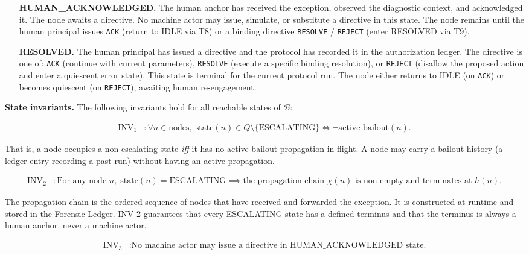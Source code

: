 \begin{itemize}
\item[\textbf{HUMAN\_ACKNOWLEDGED.}] The human anchor has received the exception, observed the diagnostic context, and acknowledged it. The node awaits a directive. No machine actor may issue, simulate, or substitute a directive in this state. The node remains until the human principal issues \texttt{ACK} (return to IDLE via T8) or a binding directive \texttt{RESOLVE} / \texttt{REJECT} (enter RESOLVED via T9).

\item[\textbf{RESOLVED.}] The human principal has issued a directive and the protocol has recorded it in the authorization ledger. The directive is one of: \texttt{ACK} (continue with current parameters), \texttt{RESOLVE} (execute a specific binding resolution), or \texttt{REJECT} (disallow the proposed action and enter a quiescent error state). This state is terminal for the current protocol run. The node either returns to IDLE (on \texttt{ACK}) or becomes quiescent (on \texttt{REJECT}), awaiting human re-engagement.
\end{itemize}

\bigskip
\noindent\textbf{State invariants.} The following invariants hold for all reachable states of $\mathcal{B}$:

\begin{align}
\text{INV}_1 &: \forall n \in \text{nodes},\; \text{state}(n) \in Q \setminus \{\text{ESCALATING}\} \iff \neg\text{active\_bailout}(n). \tag{INV-1}
\end{align}

That is, a node occupies a non-escalating state \emph{iff} it has no active bailout propagation in flight. A node may carry a bailout history (a ledger entry recording a past run) without having an active propagation.

\begin{align}
\text{INV}_2 &: \text{For any node } n,\; \text{state}(n) = \text{ESCALATING} \implies \text{the propagation chain } \chi(n) \text{ is non-empty and terminates at } h(n). \tag{INV-2}
\end{align}

The propagation chain is the ordered sequence of nodes that have received and forwarded the exception. It is constructed at runtime and stored in the Forensic Ledger. INV-2 guarantees that every ESCALATING state has a defined terminus and that the terminus is always a human anchor, never a machine actor.

\begin{align}
\text{INV}_3 &: \text{No machine actor may issue a directive in HUMAN\_ACKNOWLEDGED state.} \tag{INV-3}
\end{align}

